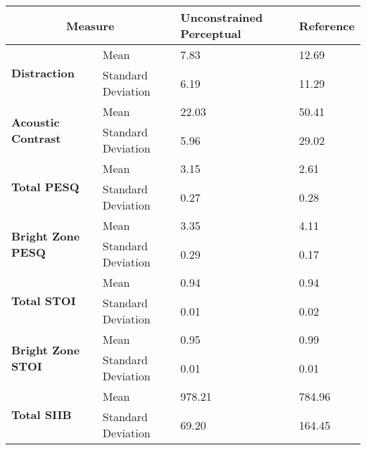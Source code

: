 \begin{table}[]
\begin{tabular}{|l|l|l|l|}
\hline
\multicolumn{2}{|c|}{\textbf{Measure}}                           & \textbf{Unconstrained Perceptual} & \textbf{Reference} \\ \hline
\multirow{2}{*}{\textbf{Distraction}}       & Mean               & 7.83                              & 12.69              \\
                                            & Standard Deviation & 6.19                              & 11.29              \\ \hline
\multirow{2}{*}{\textbf{Acoustic Contrast}} & Mean               & 22.03                             & 50.41              \\
                                            & Standard Deviation & 5.96                              & 29.02              \\ \hline
\multirow{2}{*}{\textbf{Total PESQ}}        & Mean               & 3.15                              & 2.61               \\
                                            & Standard Deviation & 0.27                              & 0.28               \\ \hline
\multirow{2}{*}{\textbf{Bright Zone PESQ}}  & Mean               & 3.35                              & 4.11               \\
                                            & Standard Deviation & 0.29                              & 0.17               \\ \hline
\multirow{2}{*}{\textbf{Total STOI}}        & Mean               & 0.94                              & 0.94               \\
                                            & Standard Deviation & 0.01                              & 0.02               \\ \hline
\multirow{2}{*}{\textbf{Bright Zone STOI}}  & Mean               & 0.95                              & 0.99               \\
                                            & Standard Deviation & 0.01                              & 0.01               \\ \hline
\multirow{2}{*}{\textbf{Total SIIB}}        & Mean               & 978.21                            & 784.96             \\
                                            & Standard Deviation & 69.20                             & 164.45             \\ \hline

\end{tabular}
\end{table}
